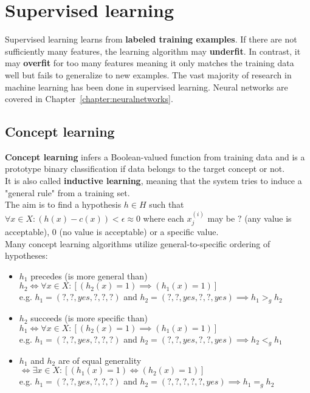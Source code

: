 \documentclass{report}
\begin{document}
\chapter{Supervised learning}
Supervised learning learns from {\bf labeled training examples}. If there are not sufficiently many features, the learning algorithm may {\bf underfit}.
In contrast, it may {\bf overfit} for too many features meaning it only matches the training data well but fails to generalize to new examples.
The vast majority of research in machine learning has been done in supervised learning.
Neural networks are covered in Chapter~\ref{chapter:neuralnetworks}.

\section{Concept learning}
{\bf Concept learning} infers a Boolean-valued function from training data and is a prototype binary classification if data belongs to the target concept or not.
\\
It is also called {\bf inductive learning}, meaning that the system tries to induce a "general rule" from a training set.
\\
The aim is to find a hypothesis $h\in H$ such that $\forall x\in X: (h(x) - c(x)) < \epsilon \approx 0$ where each $x^{(i)}_j$ may be $?$ (any value is acceptable), $0$ (no value is acceptable) or a specific value.
\\
Many concept learning algorithms utilize general-to-specific ordering of hypotheses:
\begin{itemize}
\item $h_1$ precedes (is more general than) $h_2 \iff \forall x\in X: [(h_2(x)=1)\implies (h_1(x)=1)]$ \\
e.g. $h_1 = (?,?,yes,?,?,?)$ and $h_2 = (?,?,yes,?,?,yes) \implies h_1 >_g h_2$
\item $h_2$ succeeds (is more specific than) $h_1 \iff \forall x\in X: [(h_2(x)=1)\implies (h_1(x)=1)]$ \\
e.g. $h_1 = (?,?,yes,?,?,?)$ and $h_2 = (?,?,yes,?,?,yes)  \implies h_2 <_g h_1$
\item $h_1$ and $h_2$ are of equal generality $\iff \exists x\in X: [(h_1(x)=1)\iff (h_2(x)=1)]$ \\
e.g. $h_1 = (?,?,yes,?,?,?)$ and $h_2 = (?,?,?,?,?,yes) \implies h_1 =_g h_2$
\end{itemize}
\end{document}
